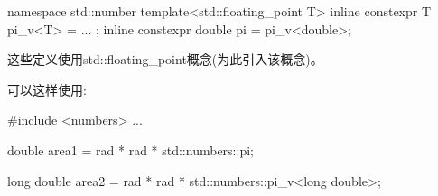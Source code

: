 \begin{cpp}
namespace std::number {
	template<std::floating_point T> inline constexpr T pi_v<T> = ... ;
	inline constexpr double pi = pi_v<double>;
}
\end{cpp}

这些定义使用std::floating\_point概念(为此引入该概念)。

可以这样使用:

\begin{cpp}
#include <numbers>
...

double area1 = rad * rad * std::numbers::pi;

long double area2 = rad * rad * std::numbers::pi_v<long double>;
\end{cpp}























